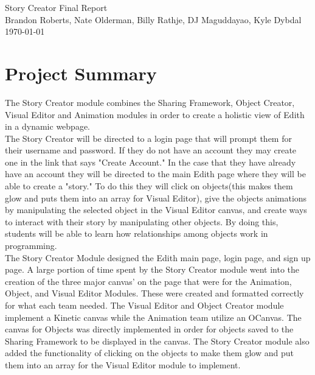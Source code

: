 \documentclass[12pt]{article}
\begin{document}

\begin{titlepage}
	\vspace*{\fill} %
	\begin{center}
		{\Huge Story Creator Final Report}\\ [0.5cm]	%
		{\Large Brandon Roberts, Nate Olderman, Billy Rathje, DJ Maguddayao, Kyle Dybdal}\\[0.4cm]
		\today %
	\end{center}
	\vspace*{\fill}
\end{titlepage}

\section{Project Summary}
The Story Creator module combines the Sharing Framework, Object Creator, Visual Editor and Animation modules in order to create a holistic view of Edith in a dynamic webpage. \\

The Story Creator will be directed to a login page that will prompt them for their username and password.  If they do not have an account they may create one in the link that says "Create Account."  In the case that they have already have an account they will be directed to the main Edith page where they will be able to create a "story." To do this they will click on objects(this makes them glow and puts them into an array for Visual Editor), give the objects animations by manipulating the selected object in the Visual Editor canvas, and create ways to interact with their story by manipulating other objects. By doing this, students will be able to learn how relationships among objects work in programming. \\

The Story Creator Module designed the Edith main page, login page, and sign up page.  A large portion of time spent by the Story Creator module went into the creation of the three major canvas' on the page that were for the Animation, Object, and Visual Editor Modules.  These were created and formatted correctly for what each team needed.  The Visual Editor and Object Creator module implement a Kinetic canvas while the Animation team utilize an OCanvas.  The canvas for Objects was directly implemented in order for objects saved to the Sharing Framework to be displayed in the canvas.  The Story Creator module also added the functionality of clicking on the objects to make them glow and put them into an array for the Visual Editor module to implement.   
\end{document}
